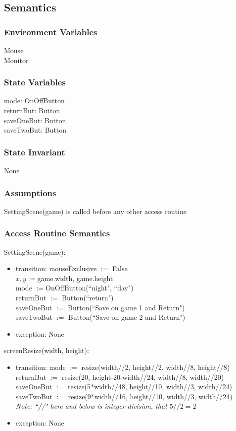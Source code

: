 \documentclass{article}
\begin{document}
\subsection {Semantics}

\subsubsection {Environment Variables}
Mouse\\
Monitor

\subsubsection {State Variables}
mode: OnOffButton\\
returnBut: Button\\
saveOneBut: Button\\
saveTwoBut: Button

\subsubsection {State Invariant}
None

\subsubsection {Assumptions}
SettingScene(game) is called before any other access routine

\subsubsection {Access Routine Semantics}
\noindent SettingScene(game):
\begin{itemize}
\item transition: mouseExclusive $:=$ False\\
    $x,y := $game.width, game.height\\
    mode $:= $OnOffButton(``night", ``day")\\
    returnBut $:=$ Button(``return")\\
    saveOneBut $:=$ Button(``Save on game 1 and Return")\\
    saveTwoBut $:=$ Button(``Save on game 2 and Return")
\item exception: None
\end{itemize}\vspace{6mm}

\noindent screenResize(width, height):
\begin{itemize}
\item transition: mode $:=$ resize(width//2, height//2, width//8, height//8)\\
    returnBut $:=$ resize(20, height-20-width//24, width//8, width//20)\\
    saveOneBut $:=$ resize(5*width//48, height//10, width//3, width//24)\\
    saveTwoBut $:=$ resize(9*width//16, height//10, width//3, width//24)\\
\textit{Note: ``//" here and below is integer division, that $5//2 = 2$}
\item exception: None
\end{itemize}\vspace{6mm}
\end{document}
